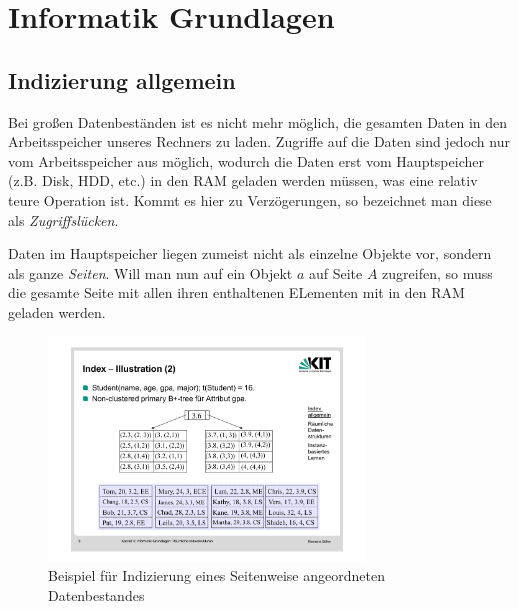 \section{Informatik Grundlagen}

\subsection{Indizierung allgemein}
Bei großen Datenbeständen ist es nicht mehr möglich, die gesamten Daten in den
Arbeitsspeicher unseres Rechners zu laden. Zugriffe auf die Daten sind jedoch nur
vom Arbeitsspeicher aus möglich, wodurch die Daten erst vom Hauptspeicher (z.B. Disk,
HDD, etc.) in den RAM geladen werden müssen, was eine relativ teure Operation ist.
Kommt es hier zu Verzögerungen, so bezeichnet man diese als \textit{Zugriffslücken}.

Daten im Hauptspeicher liegen zumeist nicht als einzelne Objekte vor, sondern als
ganze \textit{Seiten}. Will man nun auf ein Objekt \(a\) auf Seite \(A\) zugreifen,
so muss die gesamte Seite mit allen ihren enthaltenen ELementen mit in den RAM geladen
werden.

\begin{figure}[ht]
	\centering
	\includegraphics[width=0.75\textwidth]{Figures/index_example}
	\caption[Indizierung Beispiel]{Beispiel für Indizierung eines Seitenweise angeordneten Datenbestandes \footnotemark}
	\label{fig:index_example}
\end{figure}

